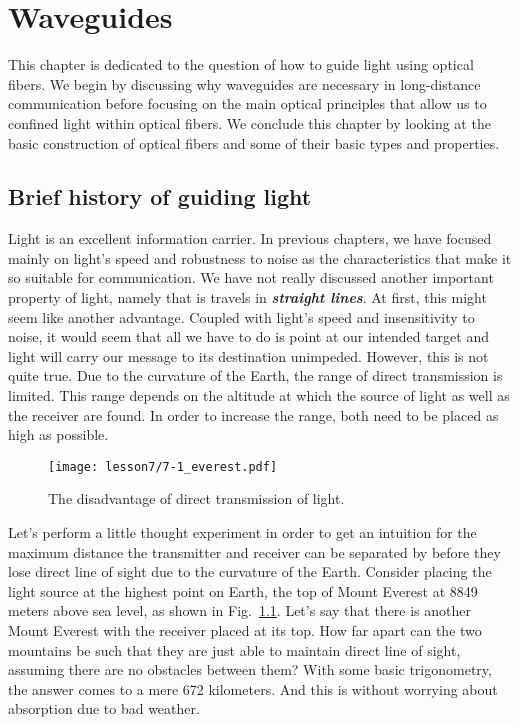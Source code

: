 \chapter{Waveguides}
\label{sec:7_waveguides}

This chapter is dedicated to the question of how to guide light using optical fibers.
We begin by discussing why waveguides are necessary in long-distance communication before focusing on the main optical principles that allow us to confined light within optical fibers.
We conclude this chapter by looking at the basic construction of optical fibers and some of their basic types and properties.

\section{Brief history of guiding light}
\label{sec:7-1_history}

Light is an excellent information carrier.
In previous chapters, we have focused mainly on light's speed and robustness to noise as the characteristics that make it so suitable for communication.
We have not really discussed another important property of light, namely that is travels in \emph{\textbf{straight lines}}.
At first, this might seem like another advantage.
Coupled with light's speed and insensitivity to noise, it would seem that all we have to do is point at our intended target and light will carry our message to its destination unimpeded.
However, this is not quite true.
Due to the curvature of the Earth, the range of direct transmission is limited.
This range depends on the altitude at which the source of light as well as the receiver are found.
In order to increase the range, both need to be placed as high as possible.

\begin{figure}[H]
    \centering
    \texttt{[image: lesson7/7-1\_everest.pdf]}
    \caption[Two Everests.]{The disadvantage of direct transmission of light.}
    \label{fig:7-1_everest}
\end{figure}

Let's perform a little thought experiment in order to get an intuition for the maximum distance the transmitter and receiver can be separated by before they lose direct line of sight due to the curvature of the Earth.
Consider placing the light source at the highest point on Earth, the top of Mount Everest at 8849 meters above sea level, as shown in Fig.~\ref{fig:7-1_everest}.
Let's say that there is another Mount Everest with the receiver placed at its top.
How far apart can the two mountains be such that they are just able to maintain direct line of sight, assuming there are no obstacles between them?
With some basic trigonometry, the answer comes to a mere 672 kilometers.
And this is without worrying about absorption due to bad weather.

